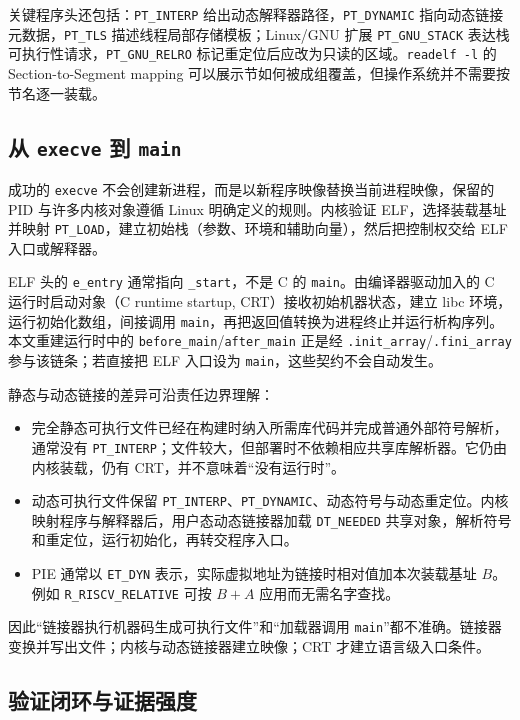 关键程序头还包括：\texttt{PT\_INTERP} 给出动态解释器路径，\texttt{PT\_DYNAMIC} 指向动态链接元数据，\texttt{PT\_TLS} 描述线程局部存储模板；Linux/GNU 扩展 \texttt{PT\_GNU\_STACK} 表达栈可执行性请求，\texttt{PT\_GNU\_RELRO} 标记重定位后应改为只读的区域。\texttt{readelf -l} 的 Section-to-Segment mapping 可以展示节如何被成组覆盖，但操作系统并不需要按节名逐一装载。

\subsection{从 \texttt{execve} 到 \texttt{main}}

成功的 \texttt{execve} 不会创建新进程，而是以新程序映像替换当前进程映像，保留的 PID 与许多内核对象遵循 Linux 明确定义的规则\cite{bin-linux-execve}。内核验证 ELF，选择装载基址并映射 \texttt{PT\_LOAD}，建立初始栈（参数、环境和辅助向量），然后把控制权交给 ELF 入口或解释器。

ELF 头的 \texttt{e\_entry} 通常指向 \texttt{\_start}，不是 C 的 \texttt{main}。由编译器驱动加入的 C 运行时启动对象（C runtime startup, CRT）接收初始机器状态，建立 libc 环境，运行初始化数组，间接调用 \texttt{main}，再把返回值转换为进程终止并运行析构序列。本文重建运行时中的 \texttt{before\_main}/\texttt{after\_main} 正是经 \texttt{.init\_array}/\texttt{.fini\_array} 参与该链条；若直接把 ELF 入口设为 \texttt{main}，这些契约不会自动发生。

静态与动态链接的差异可沿责任边界理解：

\begin{itemize}
  \item 完全静态可执行文件已经在构建时纳入所需库代码并完成普通外部符号解析，通常没有 \texttt{PT\_INTERP}；文件较大，但部署时不依赖相应共享库解析器。它仍由内核装载，仍有 CRT，并不意味着“没有运行时”。
  \item 动态可执行文件保留 \texttt{PT\_INTERP}、\texttt{PT\_DYNAMIC}、动态符号与动态重定位。内核映射程序与解释器后，用户态动态链接器加载 \texttt{DT\_NEEDED} 共享对象，解析符号和重定位，运行初始化，再转交程序入口\cite{bin-sysv-gabi-dynamic}。
  \item PIE 通常以 \texttt{ET\_DYN} 表示，实际虚拟地址为链接时相对值加本次装载基址 \(B\)。例如 \texttt{R\_RISCV\_RELATIVE} 可按 \(B+A\) 应用而无需名字查找。
\end{itemize}

因此“链接器执行机器码生成可执行文件”和“加载器调用 \texttt{main}”都不准确。链接器变换并写出文件；内核与动态链接器建立映像；CRT 才建立语言级入口条件。

\subsection{验证闭环与证据强度}

